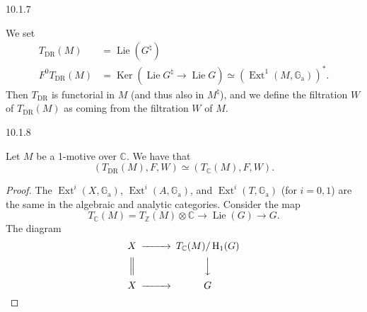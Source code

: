 \begin{construction}{10.1.7}
    
  \par{}We set
    \[       \begin {aligned}         T_\mathrm {DR}(M)         &= \operatorname {Lie}(G^\natural )       \\F^0T_\mathrm {DR}(M)         &= \operatorname {Ker}(\operatorname {Lie} G^\natural \to \operatorname {Lie} G)         \simeq  (\operatorname {Ext}^1(M,\mathbb {G}_\mathrm {a}))^*.       \end {aligned}     \]
    Then \(T_\mathrm {DR}\) is functorial in \(M\) (and thus also in \(M^\natural \)), and we define the filtration \(W\) of \(T_\mathrm {DR}(M)\) as coming from the filtration \(W\) of \(M\).\end{construction}\begin{construction}{10.1.8}\label{hodge-theory-iii-10.1.8}\skipsinglepar\par{}Let \(M\) be a 1-motive over \(\mathbb {C}\).
    We have that
    \[       (T_\mathrm {DR}(M),F,W)       \simeq  (T_\mathbb {C}(M),F,W).     \]\begin{proof}\par{}The \(\operatorname {Ext}^i(X,\mathbb {G}_\mathrm {a})\), \(\operatorname {Ext}^i(A,\mathbb {G}_\mathrm {a})\), and \(\operatorname {Ext}^i(T,\mathbb {G}_\mathrm {a})\) (for \(i=0,1\)) are the same in the algebraic and analytic categories.
      Consider the map
      \[         T_\mathbb {C}(M)         = T_\mathbb {Z}(M)\otimes \mathbb {C}         \to  \operatorname {Lie}(G)         \to  G.       \]
      The diagram
      \[         \begin {CD}           X @>>> T_\mathbb {C}(M)/\operatorname {H}_1(G)         \\@| @VVV         \\X @>>> G         \end {CD}       \]
      

\end{proof}
\end{construction}
